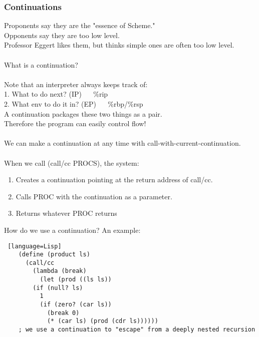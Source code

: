 \documentclass[../../lecture_notes.tex]{subfiles}
\begin{document}
\subsubsection*{Continuations}
\noindent Proponents say they are the "essence of Scheme."\\
\noindent Opponents say they are too low level.\\
\noindent Professor Eggert likes them, but thinks simple ones are often too low level.\\
\\
What is a continuation?\\
\\
 Note that an interpreter always keeps track of:\\
 1. What to do next? (IP) ~~ \%rip\\
 2. What env to do it in? (EP) ~~ \%rbp/\%rsp\\
 A continuation packages these two things as a pair.\\
 Therefore the program can easily control flow!\\
\\
We can make a continuation at any time with call-with-current-continuation.\\
\\
 When we call (call/cc PROCS), the system:\\
 \begin{enumerate} [itemsep=0mm]
	\item Creates a continuation pointing at the return address of call/cc.
	\item Calls PROC with the continuation as a parameter.
	\item Returns whatever PROC returns
\end{enumerate}

\noindent How do we use a continuation? An example:
\begin{lstlisting} [language=Lisp]
	(define (product ls)
	  (call/cc
	    (lambda (break)
	      (let (prod ((ls ls))
		(if (null? ls)
		  1
		  (if (zero? (car ls))
		    (break 0)
		    (* (car ls) (prod (cdr ls))))))
	; we use a continuation to "escape" from a deeply nested recursion
\end{lstlisting}
\end{document}
